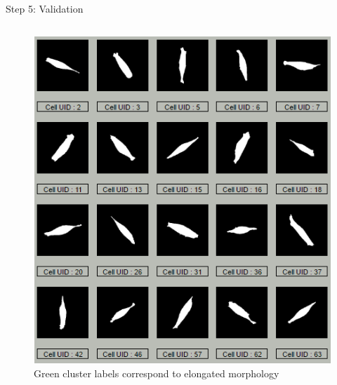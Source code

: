 \documentclass[final,hyperref={pdfpagelabels=false}]{beamer}
\begin{document}
\begin{frame}[t]
\begin{columns}[t]
\begin{column}{.31\textwidth}
\begin{block}{Step 5: Validation}
\begin{columns}
\begin{column}{.48\textwidth}
\centering
\begin{figure}
\includegraphics[width=0.99\linewidth]{cluster_fig2.png}
\captionsetup{justification=raggedright,singlelinecheck=false,labelformat=empty}
\caption{Green cluster labels correspond to elongated morphology}
\end{figure}
\end{column}

\end{columns}

\vspace{0.5em}

\begin{columns}


\end{columns}
\end{block}
\end{column}
\end{columns}
\end{frame}
\end{document}
